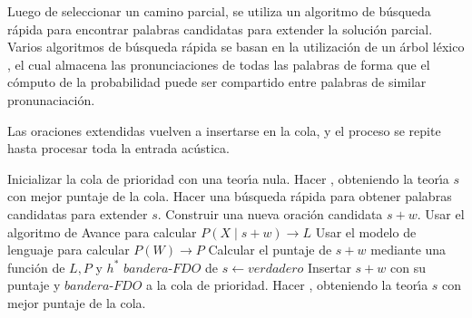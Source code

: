  Luego de seleccionar un camino parcial, se utiliza un algoritmo de b\'usqueda r\'apida para encontrar palabras candidatas para extender
 la soluci\'on parcial. Varios algoritmos de b\'usqueda \cite{GuptaFast1988, BahlSpeech1993} r\'apida se basan en la utilizaci\'on de un \'
 arbol l\'exico \cite{KlovstadCasper1975}, el cual almacena las pronunciaciones de todas las palabras de forma que el c\'omputo de la 
 probabilidad puede ser compartido entre palabras de similar pronunaciaci\'on.

Las oraciones extendidas vuelven a insertarse en la cola, y el proceso se repite hasta procesar toda la entrada ac\'ustica.

\begin{algorithm}[H]
	\caption{Algoritmo A*} \label{stack}
\begin{algorithmic}[1]
	\STATE Inicializar la cola de prioridad con una teor{\'\i}a nula.
	\STATE Hacer , obteniendo la teor{\'\i}a $s$ con mejor puntaje de la cola.
		\STATE Hacer una b\'usqueda r\'apida para obtener palabras candidatas para extender $s$.
			\STATE Construir una nueva oraci\'on candidata $s + w$.
			\STATE Usar el algoritmo de Avance para calcular $P(X \mid s + w) \rightarrow L$
			\STATE Usar el modelo de lenguaje para calcular $P(W) \rightarrow P$
			\STATE Calcular el puntaje de $s + w$ mediante una funci\'on de $L, P$ y $h^*$
				\STATE $bandera\mbox{-}FDO$ de $s \leftarrow verdadero$
			\ENDIF
			\STATE Insertar $s + w$ con su puntaje y $bandera\mbox{-}FDO$ a la cola de prioridad.
			\STATE Hacer , obteniendo la teor{\'\i}a $s$ con mejor puntaje de la cola.
		\ENDFOR
	\ENDWHILE
\end{algorithmic}
\end{algorithm}
